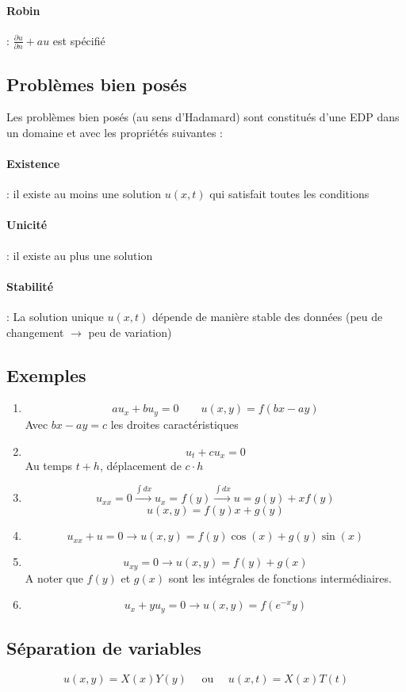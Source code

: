 \documentclass[resume]{subfiles}
\begin{document}
\paragraph{Robin} : $\frac{\partial u}{\partial n}+au$ est spécifié
\subsection{Problèmes bien posés}
Les problèmes bien posés (au sens d'Hadamard) sont constitués d'une EDP dans un domaine et avec les propriétés suivantes :
\paragraph{Existence} : il existe au moins une solution $u(x,t)$ qui satisfait toutes les conditions
\paragraph{Unicité} : il existe au plus une solution
\paragraph{Stabilité} : La solution unique $u(x,t)$ dépende de manière stable des données (peu de changement $\to$ peu de variation)
\subsection{Exemples}
\begin{enumerate}
\item 
$$au_x+bu_y=0\qquad u(x,y)=f(bx-ay)$$
Avec $bx-ay=c$ les droites caractéristiques
\item 
$$u_t+cu_x=0$$
Au temps $t+h$, déplacement de $c\cdot h$
\item 
$$u_{xx}=0\xrightarrow{\int dx} u_x=f(y)\xrightarrow{\int dx} u=g(y)+xf(y)$$
$$u(x,y)=f(y)x+g(y)$$
\item \begin{small}$$u_{xx}+u=0\rightarrow u(x,y)=f(y)\cos(x)+g(y)\sin(x)$$\end{small}
\item $$u_{xy}=0\longrightarrow u(x,y)=f(y)+g(x)$$
A noter que $f(y)$ et $g(x)$ sont les intégrales de fonctions intermédiaires.
\item $$u_x+yu_y=0\longrightarrow u(x,y)=f(e^{-x}y)$$
\end{enumerate}
\subsection{Séparation de variables}
$$u(x,y)=X(x)Y(y)\quad \text{ ou }\quad u(x,t)=X(x)T(t)$$
\end{document}
